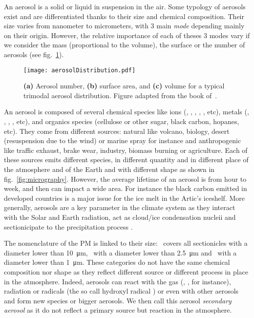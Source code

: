 An aerosol is a solid or liquid in suspension in the air.  Some
typology of aerosols exist and are differentiated thanks to their size and
chemical composition.  Their size varies from nanometer to micrometers, with 3
main \emph{mode} depending mainly on their origin.  However, the relative
importance of each of theses 3 modes vary if we consider the mass (proportional
to the volume), the surface or the number of aerosols (see
fig.~\ref{fig:aerosolDistribution}). 

\begin{figure}[ht]
    \centering
    \texttt{[image: aerosolDistribution.pdf]}
    \caption{\textbf{(a)} Aerosol number, \textbf{(b)} surface area, and
        \textbf{(c)} volume for a typical trimodal aerosol
        distribution.  Figure adapted from the
    book of~\textcite{seinfieldAtmospheric1998}.}
    \label{fig:aerosolDistribution}
\end{figure}

An aerosol is composed of several chemical species like ions (\SOq, \NOt, ,
, , etc), metals (, , , , etc), and organics species
(cellulose or other sugar, \og black carbon\fg, hopanes, etc).  They come from different
sources: natural like volcano, biology, desert (resuspension due to the wind) or marine
spray for instance and anthropogenic like traffic exhaust, brake wear, industry, biomass
burning or agriculture.  Each of these sources emits different species, in different
quantity and in different place of the atmosphere and of the Earth and with different
shape as shown in fig.~\ref{fig:micrography}.  However, the average lifetime of an aerosol
is from hour to week, and then can impact a wide area.  For instance the black carbon
emitted in developed countries is a major issue for the ice melt in the Artic's iceshelf.
More generally, aerosols are a key parameter in the climate system as they interact with
the Solar and Earth radiation, act as cloud/ice condensation nucleii and sectionicipate to
the precipitation process \autocite{boucherClouds2013}.

The nomenclature of the PM is linked to their size: \PMdix~covers all sectionicles with a
diameter lower than \SI{10}{\um}, \PMdc~with a diameter lower than \SI{2.5}{\um} and
\PMun~with a diameter lower than \SI{1}{\um}.  These categories do not have the same
chemical composition nor shape as they reflect different source or different process in
place in the atmosphere. Indeed, aerosols can react with the gas (,
,  for instance), radiation or radicals (the so call hydroxyl radical
) or even with other aerosols and form new species or bigger aerosols. We then
call this aerosol \emph{secondary aerosol} as it do not reflect a primary source but
reaction in the atmosphere.

